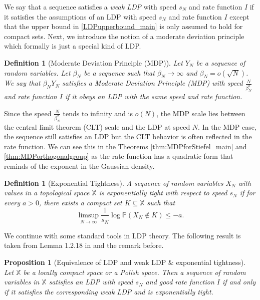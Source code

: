\documentclass[11pt,a4paper,twoside]{article}
\renewcommand{\P}{\mathbb P}
\newtheorem{df}[thm]{Definition}
\newtheorem{proposition}[thm]{Proposition}
\theoremstyle{definition}
\begin{document}
	We say that a sequence satisfies a \emph{weak LDP} with speed $s_N$ and rate function $I$ if it satisfies the assumptions of an LDP with speed $s_N$ and rate function $I$ except that the upper bound in \eqref{LDPupperbound_main} is only assumed to hold for compact sets. Next, we introduce the notion of a moderate deviation principle which formally is just a special kind of LDP. 

    \begin{df}[Moderate Deviation Principle (MDP)]\label{def:MDP_main} 
        Let $Y_N$ be a sequence of random variables. Let $\beta_N$ be a sequence such that $\beta_N \to \infty$ and $\beta_N = o(\sqrt{N})$. We say that $\beta_N Y_N$ satisfies a \emph{Moderate Deviation Principle (MDP)} with speed $\frac{N}{\beta_N^2}$ and rate function $I$ if it obeys an LDP with the same speed and rate function.
    \end{df}

	\noindent Since the speed $\frac{N}{\beta_N^2}$ tends to infinity and is $o(N)$, the MDP scale lies between the central limit theorem (CLT) scale and the LDP at speed $N$. In the MDP case, the sequence still satisfies an LDP but the CLT behavior is often reflected in the rate function. We can see this in the Theorems \ref{thm:MDPforStiefel_main} and \ref{thm:MDPorthogonalgroup} as the rate function has a quadratic form that reminds of the exponent in the Gaussian density. 

	\begin{df}[Exponential Tightness]\label{def:exponentialtightness_main} 
		A sequence of random variables $X_N$ with values in a topological space $\mathbb{X}$ is \emph{exponentially tight} with respect to speed $s_N$ if for every $a>0$, there exists a compact set $K\subseteq \mathbb{X}$ such that 
		$$\limsup_{N\to\infty} \frac{1}{s_N} \log \P(X_N\notin K) \le -a.$$
	\end{df}

	\noindent We continue with some standard tools in LDP theory. The following result is taken from Lemma 1.2.18 in \cite{dembo2009techniques} and the remark before.
	\begin{proposition}[Equivalence of LDP and weak LDP \& exponential tightness]\label{thm:LDPequivalence} 
		Let $\mathbb{X}$ be a locally compact space or a Polish space. Then a sequence of random variables in $\mathbb{X}$ satisfies an LDP with speed $s_N$ and good rate function $I$ if and only if it satisfies the corresponding weak LDP and is exponentially tight. 
	\end{proposition}
\end{document}
